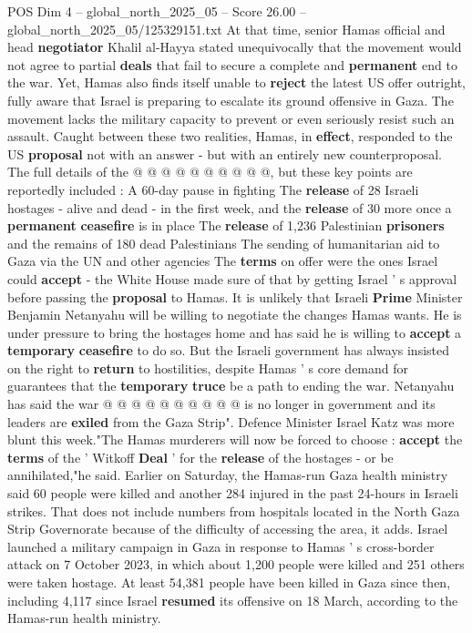 \begin{textsample}{POS Dim 4 – global\_north\_2025\_05 – Score 26.00 – global\_north\_2025\_05/125329151.txt}
At that time, senior Hamas official and head \textbf{negotiator} Khalil al-Hayya stated unequivocally that the movement would not agree to partial \textbf{deals} that fail to secure a complete and \textbf{permanent} end to the war.
Yet, Hamas also finds itself unable to \textbf{reject} the latest US offer outright, fully aware that Israel is preparing to escalate its ground offensive in Gaza.
The movement lacks the military capacity to prevent or even seriously resist such an assault.
Caught between these two realities, Hamas, in \textbf{effect}, responded to the US \textbf{proposal} not with an answer - but with an entirely new counterproposal.
The full details of the @ @ @ @ @ @ @ @ @ @, but these key points are reportedly included : A 60-day pause in fighting The \textbf{release} of 28 Israeli hostages - alive and dead - in the first week, and the \textbf{release} of 30 more once a \textbf{permanent} \textbf{ceasefire} is in place The \textbf{release} of 1,236 Palestinian \textbf{prisoners} and the remains of 180 dead Palestinians The sending of humanitarian aid to Gaza via the UN and other agencies The \textbf{terms} on offer were the ones Israel could \textbf{accept} - the White House made sure of that by getting Israel ' s approval before passing the \textbf{proposal} to Hamas.
It is unlikely that Israeli \textbf{Prime} Minister Benjamin Netanyahu will be willing to negotiate the changes Hamas wants.
He is under pressure to bring the hostages home and has said he is willing to \textbf{accept} a \textbf{temporary} \textbf{ceasefire} to do so.
But the Israeli government has always insisted on the right to \textbf{return} to hostilities, despite Hamas ' s core demand for guarantees that the \textbf{temporary} \textbf{truce} be a path to ending the war.
Netanyahu has said the war @ @ @ @ @ @ @ @ @ @ is no longer in government and its leaders are \textbf{exiled} from the Gaza Strip".
Defence Minister Israel Katz was more blunt this week."The Hamas murderers will now be forced to choose : \textbf{accept} the \textbf{terms} of the ' Witkoff \textbf{Deal} ' for the \textbf{release} of the hostages - or be annihilated,"he said.
Earlier on Saturday, the Hamas-run Gaza health ministry said 60 people were killed and another 284 injured in the past 24-hours in Israeli strikes.
That does not include numbers from hospitals located in the North Gaza Strip Governorate because of the difficulty of accessing the area, it adds.
Israel launched a military campaign in Gaza in response to Hamas ' s cross-border attack on 7 October 2023, in which about 1,200 people were killed and 251 others were taken hostage.
At least 54,381 people have been killed in Gaza since then, including 4,117 since Israel \textbf{resumed} its offensive on 18 March, according to the Hamas-run health ministry.

\end{textsample}
